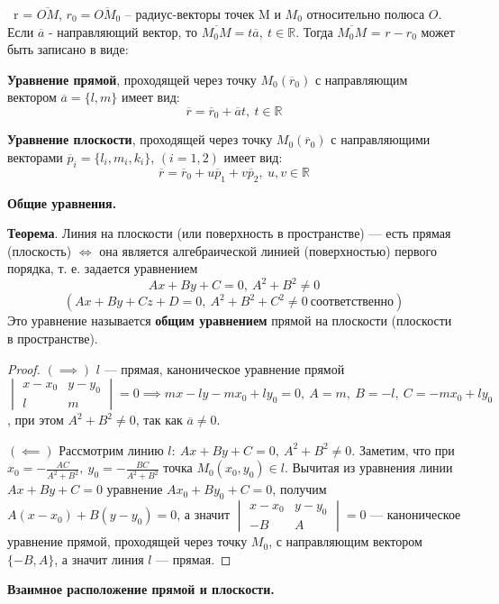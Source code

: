 \mathLet \ r = $\overline{OM}$, $r_0 = \overline{OM_0}$ -- радиус-векторы точек M и $M_0$ относительно полюса $O$. Если $\overline{a}$ - направляющий вектор, то $\overline{M_0M} = t\overline{a},~t\in\mathbb{R}$. Тогда $\overline{M_0M}$ = $r-r_0$ может быть записано в виде:

\textbf{Уравнение прямой}, проходящей через точку $M_0(\overline{r}_0)$ с направляющим вектором $\overline{a}=\{l,m\}$ имеет вид:
$$\overline{r} = \overline{r}_0 + \overline{a}t,~t\in\mathbb{R}$$

\textbf{Уравнение плоскости}, проходящей через точку $M_0(\overline{r}_0)$ с направляющими векторами $\overline{p}_i=\{l_i,m_i,k_i\}$, $(i=1,2)$ имеет вид:
$$\overline{r} = \overline{r}_0 + u\overline{p}_1 + v\overline{p}_2,~u,v\in\mathbb{R}$$

\bigbreak
\centerline{\textbf{Общие уравнения.}}

\textbf{Теорема}. Линия на плоскости (или поверхность в пространстве) --- есть прямая (плоскость) $\iff$ она является алгебраической линией (поверхностью) первого порядка, т. е. задается уравнением $$Ax+By+C=0,~A^2+B^2\neq0$$ $$(Ax+By+Cz+D=0,~A^2+B^2+C^2\neq0~\text{соответственно})$$ 
Это уравнение называется \textbf{общим уравнением} прямой на плоскости (плоскости в пространстве).

\begin{proof} $(\implies)$
$l$ --- прямая, каноническое уравнение прямой $\begin{vmatrix} x-x_0 & y-y_0 \\ l & m \end{vmatrix} = 0 \implies mx -ly -mx_0 +ly_0 = 0,~A=m,~B=-l,~C=-mx_0 +ly_0$, при этом $A^2+B^2\neq0$, так как $\overline{a}\neq 0$.

$(\impliedby)$ Рассмотрим линию $l:~Ax+By+C=0,~A^2+B^2\neq0$. Заметим, что при $x_0=-\frac{AC}{A^2+B^2},~y_0=-\frac{BC}{A^2+B^2}$ точка $M_0(x_0,y_0)\in l$. Вычитая из уравнения линии $Ax+By+C=0$ уравнение $Ax_0+By_0+C=0$, получим $A(x-x_0)+B(y-y_0)=0$, а значит $\begin{vmatrix} x-x_0 & y-y_0 \\ -B & A \end{vmatrix} = 0$ --- каноническое уравнение прямой, проходящей через точку $M_0$, с направляющим вектором $\{-B,A\}$, а значит линия $l$ --- прямая. 
\end{proof}
    


\textbf{Взаимное расположение прямой и плоскости.} 

